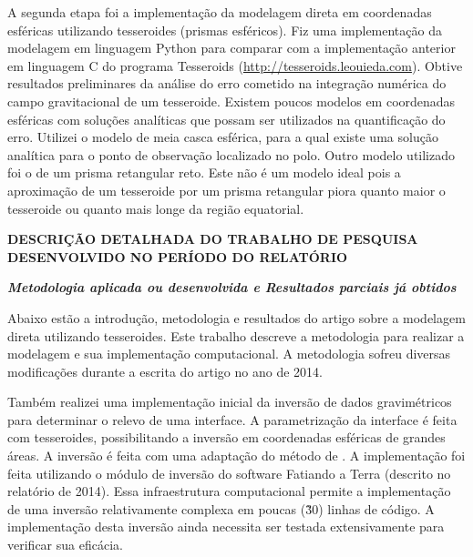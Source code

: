 \documentclass[12pt,a4paper]{article}
\begin{document}
A segunda etapa foi a implementação da modelagem direta em coordenadas
esféricas utilizando tesseroides (prismas esféricos).
Fiz uma implementação da modelagem em linguagem Python para comparar com a
implementação anterior em linguagem C do programa Tesseroids
(\href{http://tesseroids.leouieda.com}{http://tesseroids.leouieda.com}).
Obtive resultados preliminares da análise do erro cometido na integração
numérica do campo gravitacional de um tesseroide.
Existem poucos modelos em coordenadas esféricas com soluções analíticas que
possam ser utilizados na quantificação do erro.
Utilizei o modelo de meia casca esférica, para a qual existe uma solução
analítica para o ponto de observação localizado no polo.
Outro modelo utilizado foi o de um prisma retangular reto.
Este não é um modelo ideal pois a aproximação de um tesseroide por um prisma
retangular piora quanto maior o tesseroide ou quanto mais longe da região
equatorial.



\newpage

\begin{center}
\textbf{\large DESCRIÇÃO DETALHADA DO TRABALHO DE PESQUISA DESENVOLVIDO NO
PERÍODO DO RELATÓRIO}
\end{center}

\vspace{1cm}

{\centering\bfseries\itshape
Metodologia aplicada ou desenvolvida
e
Resultados parciais já obtidos
\par}

\bigskip

Abaixo estão a introdução, metodologia e resultados do artigo sobre a
modelagem direta utilizando tesseroides.
Este trabalho descreve a metodologia para realizar a modelagem e sua
implementação computacional.
A metodologia sofreu diversas modificações durante a escrita do artigo
no ano de 2014.

Também realizei uma implementação inicial da inversão de dados gravimétricos
para determinar o relevo de uma interface.
A parametrização da interface é feita com tesseroides, possibilitando a
inversão em coordenadas esféricas de grandes áreas.
A inversão é feita com uma adaptação do método de \citet{Silva2014}.
A implementação foi feita utilizando o módulo de inversão do software
Fatiando a Terra (descrito no relatório de 2014).
Essa infraestrutura computacional permite a implementação de uma inversão
relativamente complexa em poucas (\~30) linhas de código.
A implementação desta inversão ainda necessita ser testada extensivamente
para verificar sua eficácia.
\end{document}

